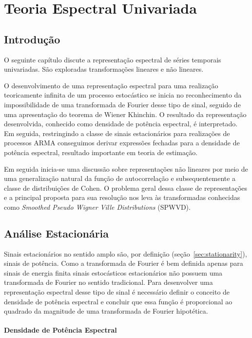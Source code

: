 \chapter{Teoria Espectral Univariada}\label{chap:spectral_analysis}

\section*{Introdução}

O seguinte capítulo discute a representação espectral de séries temporais
univariadas. São exploradas transformações lineares e não lineares.

O desenvolvimento de uma representação espectral para uma realização
teoricamente infinita de um processo estocástico se inicia no reconhecimento da
impossibilidade de uma transformada de Fourier desse tipo de sinal, seguido de
uma apresentação do teorema de Wiener Khinchin. O resultado da representação
desenvolvida, conhecido como densidade de potência espectral, é interpretado.
Em seguida, restringindo a classe de sinais estacionários para realizações de
processos ARMA conseguimos derivar expressões fechadas para a densidade
de potência espectral, resultado importante em teoria de
estimação\cite{estimation_theory}.

Em seguida inicia-se uma discussão sobre representações não lineares por meio
de uma generalização natural da função de autocorrelação e subsequentemente a
classe de distribuições de Cohen. O problema geral dessa classe de
representações e a principal proposta para sua resolução nos leva às
transformadas conhecidas como \emph{Smoothed Pseudo Wigner Ville
Distributions} (SPWVD).

\section{Análise Estacionária}

Sinais estacionários no sentido amplo são, por definição
(seção~\ref{sec:stationarity}), sinais de potência. Como a transformada de
Fourier é bem definida apenas para sinais de energia finita sinais estocásticos
estacionários não possuem uma transformada de Fourier no sentido tradicional.
Para desenvolver uma representação espectral desse tipo de sinal é necessário
definir o conceito de densidade de potência espectral e concluir que essa
função é proporcional ao quadrado da magnitude de uma transformada de Fourier
hipotética.

\subsubsection{Densidade de Potência Espectral}

